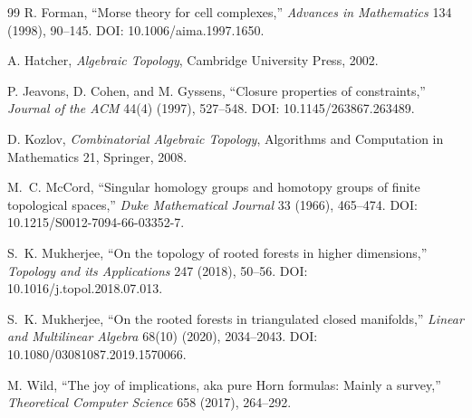 \documentclass[11pt]{article}
\theoremstyle{definition}
\theoremstyle{remark}
\begin{document}
\begin{thebibliography}{99}
R. Forman,
``Morse theory for cell complexes,''
\emph{Advances in Mathematics} 134 (1998), 90--145.
DOI: 10.1006/aima.1997.1650.

A. Hatcher,
\emph{Algebraic Topology}, Cambridge University Press, 2002.

P. Jeavons, D. Cohen, and M. Gyssens,
``Closure properties of constraints,''
\emph{Journal of the ACM} 44(4) (1997), 527--548.
DOI: 10.1145/263867.263489.

D. Kozlov,
\emph{Combinatorial Algebraic Topology},
Algorithms and Computation in Mathematics 21, Springer, 2008.

M.~C. McCord,
``Singular homology groups and homotopy groups of finite topological spaces,''
\emph{Duke Mathematical Journal} 33 (1966), 465--474.
DOI: 10.1215/S0012-7094-66-03352-7.

S.~K. Mukherjee,
``On the topology of rooted forests in higher dimensions,''
\emph{Topology and its Applications} 247 (2018), 50--56.
DOI: 10.1016/j.topol.2018.07.013.

S.~K. Mukherjee,
``On the rooted forests in triangulated closed manifolds,''
\emph{Linear and Multilinear Algebra} 68(10) (2020), 2034--2043.
DOI: 10.1080/03081087.2019.1570066.

M. Wild,
``The joy of implications, aka pure Horn formulas: Mainly a survey,''
\emph{Theoretical Computer Science} 658 (2017), 264--292.

\end{thebibliography}
\end{document}
